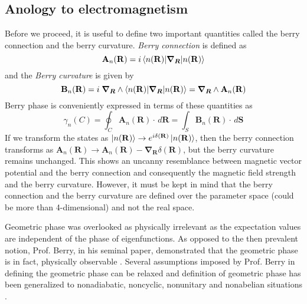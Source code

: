 \subsection{Anology to electromagnetism}
Before we proceed, it is useful to define two important quantities called the berry connection and the berry curvature. \emph{Berry connection} is defined as
\begin{equation}
 \mathbf{A}_{n}(\mathbf{R}) = i\braket{n(\mathbf{R})| \bm{\nabla_{R}} | n(\mathbf{R})}
\end{equation}
and the \emph{Berry curvature} is given by
\begin{equation}
 \mathbf{B}_{n}(\mathbf{R}) = i \;\bm{\nabla_{R}} \wedge \braket{n(\mathbf{R})| \bm{\nabla_{R}} | n(\mathbf{R})} = \bm{\nabla_{R}} \wedge \mathbf{A}_{n}(\mathbf{R})
\end{equation} Berry phase is conveniently expressed in terms of these quantities as
\begin{equation}
 \gamma_{n}(C)= \oint_{C}{\mathbf{A}_{n}(\mathbf{R})\cdot \, d\mathbf{R}} = \int_{S}{\mathbf{B}_{n}(\mathbf{R})\cdot \, d\mathbf{S}}
\end{equation}
If we transform the states as $\ket{n(\mathbf{R})} \rightarrow e^{i\delta(\mathbf{R})} \ket{n(\mathbf{R})}$, then the berry connection transforms as
$\mathbf{A}_{n}(\mathbf{R}) \rightarrow \mathbf{A}_{n}(\mathbf{R}) - \bm{\nabla_{R}} \delta(\mathbf{R})$, but the berry curvature remains unchanged. This shows an uncanny
resemblance between magnetic vector potential and the berry connection and consequently the magnetic field strength and the berry curvature. However, it must be kept in mind that
the berry connection and the berry curvature are defined over the parameter space (could be more than 4-dimensional) and not the real space.

Geometric phase was overlooked as physically irrelevant as the expectation values are independent of the phase of eigenfunctions. 
As opposed to the then prevalent notion, Prof. Berry, in his seminal paper, demonstrated that the geometric phase is in fact, physically observable \cite{berry1984quantal,wilczek1989geometric}.
Several assumptions imposed by Prof. Berry in defining the geometric phase can be relaxed and definition of geometric phase has been generalized to nonadiabatic, noncyclic, 
nonunitary and nonabelian situations \cite{aharonov1987phase, samuel1988general, wilczek1984appearance, mukunda1993quantum}.

